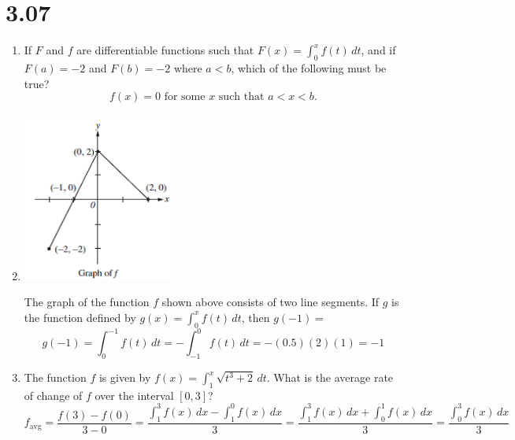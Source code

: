 \documentclass[12pt]{article}
\begin{document}
\section*{3.07}
\begin{enumerate}
    \item If $F$ and $f$ are differentiable functions such that $F(x)=\int_{0}^{x} f(t) \, dt$, and if $F(a)=-2$ and $F(b)=-2$ where $a<b$, which of the following must be true?
    $$\boxed{f(x)=0 \text{ for some } x \text{ such that } a<x<b.}$$
    \item 
    \begin{center}
        \includegraphics[width=2in]{original-22.png}
    \end{center}
    The graph of the function $f$ shown above consists of two line segments. If $g$ is the function defined by $g(x)=\int_{0}^{x}f(t)\,dt$, then $g(-1)=$
    $$g(-1)=\int_{0}^{-1}f(t)\,dt  = -\int_{-1}^{0}f(t)\,dt = -(0.5)(2)(1)=\boxed{-1}$$
    
    \item The function $f$ is given by $f(x)=\int_{1}^{x} \sqrt{t^3+2}\,dt$. What is the average rate of change of $f$ over the interval $[0,3]$?
    $$f_{\text{avg}}=\frac{f(3)-f(0)}{3-0}= \frac{\int_{1}^{3} f(x) \, dx - \int_{1}^{0} f(x) \, dx}{3} = \frac{\int_{1}^{3} f(x) \, dx + \int_{0}^{1} f(x) \, dx}{3} = \frac{\int_{0}^{3} f(x) \, dx}{3}$$
    

\end{enumerate}
\end{document}
